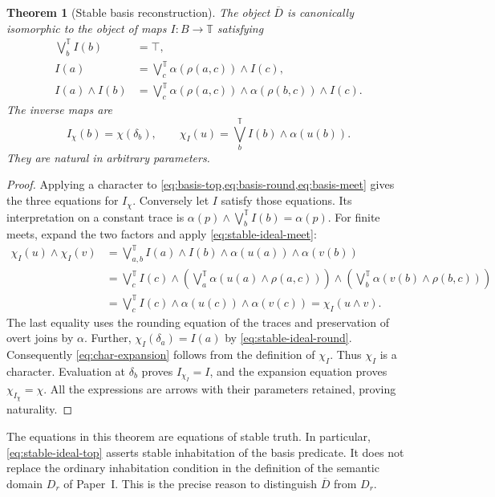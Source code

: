 \documentclass[11pt,a4paper]{article}
\numberwithin{equation}{section}
\newtheorem{theorem}{Theorem}[section]
\theoremstyle{definition}
\theoremstyle{remark}
\theoremstyle{plain}
\newcommand{\TV}{\mathbb T}
\newcommand{\joinT}{\bigvee^{\TV}}
\begin{document}
\begin{theorem}[Stable basis reconstruction]
\label{thm:stable-basis}
The object $\overline D$ is canonically isomorphic to the object of
maps $I:B\to\TV$ satisfying
\begin{align}
 \joinT_b I(b)&=\top,
 \label{eq:stable-ideal-top}\\
 I(a)&=\joinT_c\alpha(\rho(a,c))\wedge I(c),
 \label{eq:stable-ideal-round}\\
 I(a)\wedge I(b)&=
 \joinT_c\alpha(\rho(a,c))\wedge\alpha(\rho(b,c))\wedge I(c).
 \label{eq:stable-ideal-meet}
\end{align}
The inverse maps are
\begin{equation}\label{eq:stable-basis-inverses}
 I_\chi(b)=\chi(\delta_b),\qquad
 \chi_I(u)=\joinT_b I(b)\wedge\alpha(u(b)).
\end{equation}
They are natural in arbitrary parameters.
\end{theorem}
\begin{proof}
Applying a character to
\cref{eq:basis-top,eq:basis-round,eq:basis-meet} gives the three
equations for $I_\chi$. Conversely let $I$ satisfy those equations.
Its interpretation on a constant trace is
$\alpha(p)\wedge\joinT_b I(b)=\alpha(p)$. For finite meets, expand
the two factors and apply \eqref{eq:stable-ideal-meet}:
\begin{align*}
 \chi_I(u)\wedge\chi_I(v)
 &=\joinT_{a,b}I(a)\wedge I(b)\wedge\alpha(u(a))\wedge\alpha(v(b))\\
 &=\joinT_c I(c)\wedge
   \left(\joinT_a\alpha(u(a)\wedge\rho(a,c))\right)
   \wedge
   \left(\joinT_b\alpha(v(b)\wedge\rho(b,c))\right)\\
 &=\joinT_c I(c)\wedge\alpha(u(c))\wedge\alpha(v(c))
 =\chi_I(u\wedge v).
\end{align*}
The last equality uses the rounding equation of the traces and
preservation of overt joins by $\alpha$. Further,
$\chi_I(\delta_a)=I(a)$ by \eqref{eq:stable-ideal-round}.
Consequently \eqref{eq:char-expansion} follows from the definition of
$\chi_I$. Thus $\chi_I$ is a character. Evaluation at $\delta_b$
proves $I_{\chi_I}=I$, and the expansion equation proves
$\chi_{I_\chi}=\chi$. All the expressions are arrows with their
parameters retained, proving naturality.
\end{proof}

The equations in this theorem are equations of stable truth. In
particular, \eqref{eq:stable-ideal-top} asserts stable inhabitation of
the basis predicate. It does not replace the ordinary inhabitation
condition in the definition of the semantic domain $D_r$ of Paper~I.
This is the precise reason to distinguish $\overline D$ from $D_r$.
\end{document}
